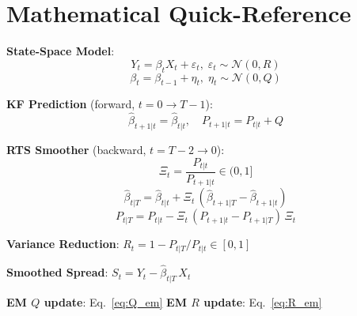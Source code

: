 \documentclass[10pt,a4paper,twocolumn]{article}
\begin{document}
\section{Mathematical Quick-Reference}

\begin{tcolorbox}[resultbox={All Formulae at a Glance}]
\textbf{State-Space Model}:
\[
  Y_t = \beta_t X_t + \varepsilon_t,\;\varepsilon_t\sim\mathcal{N}(0,R)
\]
\[
  \beta_t = \beta_{t-1} + \eta_t,\;\eta_t\sim\mathcal{N}(0,Q)
\]

\textbf{KF Prediction} (forward, $t=0\to T-1$):
\[
  \hat\beta_{t+1|t} = \hat\beta_{t|t},\quad
  P_{t+1|t} = P_{t|t} + Q
\]

\textbf{RTS Smoother} (backward, $t=T-2\to 0$):
\[
  \Xi_t = \frac{P_{t|t}}{P_{t+1|t}} \in (0,1]
\]
\[
  \hat\beta_{t|T} = \hat\beta_{t|t}
    + \Xi_t\,(\hat\beta_{t+1|T} - \hat\beta_{t+1|t})
\]
\[
  P_{t|T} = P_{t|t} - \Xi_t\,(P_{t+1|t} - P_{t+1|T})\,\Xi_t
\]

\textbf{Variance Reduction}: $R_t = 1 - P_{t|T}/P_{t|t} \in [0,1]$

\textbf{Smoothed Spread}: $S_t = Y_t - \hat\beta_{t|T}\,X_t$

\textbf{EM $Q$ update}: Eq.~\eqref{eq:Q_em} \quad
\textbf{EM $R$ update}: Eq.~\eqref{eq:R_em}
\end{tcolorbox}

\end{document}
